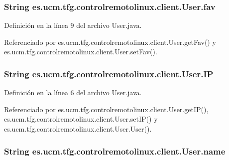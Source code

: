 \subsubsection[{fav}]{\setlength{\rightskip}{0pt plus 5cm}String es.\-ucm.\-tfg.\-controlremotolinux.\-client.\-User.\-fav\hspace{0.3cm}{\ttfamily [private]}}\label{classes_1_1ucm_1_1tfg_1_1controlremotolinux_1_1client_1_1User_a193f0878dd702baeb83eb7177baaef04}


Definición en la línea 9 del archivo User.\-java.



Referenciado por es.\-ucm.\-tfg.\-controlremotolinux.\-client.\-User.\-get\-Fav() y es.\-ucm.\-tfg.\-controlremotolinux.\-client.\-User.\-set\-Fav().

\subsubsection[{I\-P}]{\setlength{\rightskip}{0pt plus 5cm}String es.\-ucm.\-tfg.\-controlremotolinux.\-client.\-User.\-I\-P\hspace{0.3cm}{\ttfamily [private]}}\label{classes_1_1ucm_1_1tfg_1_1controlremotolinux_1_1client_1_1User_aed09daeb62c458ad324f729869fecf77}


Definición en la línea 6 del archivo User.\-java.



Referenciado por es.\-ucm.\-tfg.\-controlremotolinux.\-client.\-User.\-get\-I\-P(), es.\-ucm.\-tfg.\-controlremotolinux.\-client.\-User.\-set\-I\-P() y es.\-ucm.\-tfg.\-controlremotolinux.\-client.\-User.\-User().

\subsubsection[{name}]{\setlength{\rightskip}{0pt plus 5cm}String es.\-ucm.\-tfg.\-controlremotolinux.\-client.\-User.\-name\hspace{0.3cm}{\ttfamily [private]}}\label{classes_1_1ucm_1_1tfg_1_1controlremotolinux_1_1client_1_1User_a079d1a19e6678c424e6e816f40519f74}



